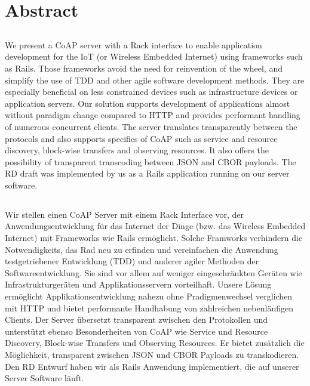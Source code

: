 \chapter*{Abstract}


\section*{}

We present a \acf{CoAP} server with a Rack interface to enable application
development for the \acl{IoT} (or Wireless Embedded Internet) using frameworks
such as \acl{Rails}. Those frameworks avoid the need for reinvention of the
wheel, and simplify the use of \ac{TDD} and other agile software development
methods. They are especially beneficial on less constrained devices such as
infrastructure devices or application servers. Our solution supports
development of applications almost without paradigm change compared to
\acs{HTTP} and provides performant handling of numerous concurrent clients. The
server translates transparently between the protocols and also supports
specifics of \ac{CoAP} such as service and resource discovery, block-wise
transfers and observing resources. It also offers the possibility of
transparent transcoding between \acs{JSON} and \acs{CBOR} payloads. The
\acl{RD} draft was implemented by us as a \acs{Rails} application running on
our server software.

\section*{}

Wir stellen einen \acf{CoAP} Server mit einem Rack Interface vor, der
Anwendungsentwicklung für das Internet der Dinge (bzw. das Wireless Embedded
Internet) mit Frameworks wie \acl{Rails} ermöglicht. Solche Framworks
verhindern die Notwendigkeits, das Rad neu zu erfinden und vereinfachen die
Anwendung testgetriebener Entwicklung (\acs{TDD}) und anderer agiler Methoden
der Softwareentwicklung. Sie sind vor allem auf weniger eingeschränkten Geräten
wie Infrastrukturgeräten und Applikationsservern vorteilhaft. Unsere Lösung
ermöglicht Applikationsentwicklung nahezu ohne Pradigmenwechsel verglichen mit
\ac{HTTP} und bietet performante Handhabung von zahlreichen nebenläufigen
Clients. Der Server übersetzt transparent zwischen den Protokollen und
unterstützt ebenso Besonderheiten von \acs{CoAP} wie Service und Resource
Discovery, Block-wise Transfers und Observing Resources. Er bietet zusätzlich
die Möglichkeit, transparent zwischen \acs{JSON} und \acs{CBOR} Payloads zu
transkodieren. Den \acl{RD} Entwurf haben wir als \acs{Rails} Anwendung
implementiert, die auf unserer Server Software läuft.
